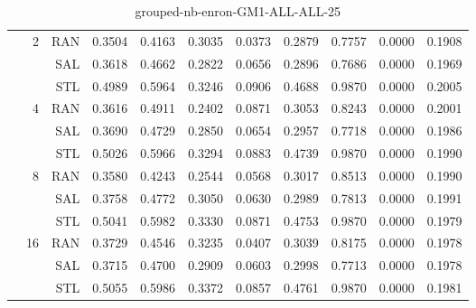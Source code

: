\begin{center}
\begin{table}[htbp]
\begin{center}
\begin{tabular}{ | r | r | r | r | r | r | r | r | r | r | r |}
 & \multirow{3}{*}{2} & RAN & 0.3504 & 0.4163 & 0.3035 & 0.0373 & 0.2879 & 0.7757 & 0.0000 & 0.1908\\ \cline{3-11}
 &   & SAL & 0.3618 & 0.4662 & 0.2822 & 0.0656 & 0.2896 & 0.7686 & 0.0000 & 0.1969\\ \cline{3-11}
 &   & STL & 0.4989 & 0.5964 & 0.3246 & 0.0906 & 0.4688 & 0.9870 & 0.0000 & 0.2005\\ \cline{2-11}
 & \multirow{3}{*}{4} & RAN & 0.3616 & 0.4911 & 0.2402 & 0.0871 & 0.3053 & 0.8243 & 0.0000 & 0.2001\\ \cline{3-11}
 &   & SAL & 0.3690 & 0.4729 & 0.2850 & 0.0654 & 0.2957 & 0.7718 & 0.0000 & 0.1986\\ \cline{3-11}
 &   & STL & 0.5026 & 0.5966 & 0.3294 & 0.0883 & 0.4739 & 0.9870 & 0.0000 & 0.1990\\ \cline{2-11}
 & \multirow{3}{*}{8} & RAN & 0.3580 & 0.4243 & 0.2544 & 0.0568 & 0.3017 & 0.8513 & 0.0000 & 0.1990\\ \cline{3-11}
 &   & SAL & 0.3758 & 0.4772 & 0.3050 & 0.0630 & 0.2989 & 0.7813 & 0.0000 & 0.1991\\ \cline{3-11}
 &   & STL & 0.5041 & 0.5982 & 0.3330 & 0.0871 & 0.4753 & 0.9870 & 0.0000 & 0.1979\\ \cline{2-11}
 & \multirow{3}{*}{16} & RAN & 0.3729 & 0.4546 & 0.3235 & 0.0407 & 0.3039 & 0.8175 & 0.0000 & 0.1978\\ \cline{3-11}
 &   & SAL & 0.3715 & 0.4700 & 0.2909 & 0.0603 & 0.2998 & 0.7713 & 0.0000 & 0.1978\\ \cline{3-11}
 &   & STL & 0.5055 & 0.5986 & 0.3372 & 0.0857 & 0.4761 & 0.9870 & 0.0000 & 0.1981\\ \cline{2-11}
\hline
\end{tabular}
\caption{grouped-nb-enron-GM1-ALL-ALL-25}
\end{center}
 \end{table}
\end{center}

